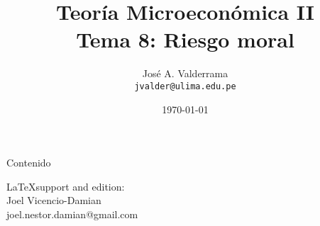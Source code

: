 \documentclass{beamer}
\title{Teoría Microeconómica II\\
		Tema 8: Riesgo moral}
\author[José A. Valderrama]{\large{José A. Valderrama}\\
		{\small \texttt{jvalder@ulima.edu.pe} {\color{black}{\faIcon{envelope}}}}}
\institute{\large Universidad de Lima - Carrera de Economía}
\date{\today}
\begin{document}
	\begin{frame}[plain]
		\maketitle
	\end{frame}
	\begin{frame}{Contenido}
		\tableofcontents
	\end{frame}

	
	

	\begin{frame}
		\maketitle
		{\small
			\LaTeX \enskip support and edition:\\
			Joel Vicencio-Damian\\
			\vspace{-0.05cm}
			joel.nestor.damian@gmail.com }
	\end{frame}

\end{document}
